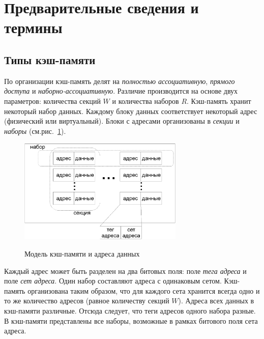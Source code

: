 

\section{Предварительные сведения и термины}


\subsection{Типы кэш-памяти}

По организации кэш-память делят на \emph{полностью ассоциативную},
\emph{прямого доступа} и \emph{наборно-ассоциативную}. Различие
производится на основе двух параметров: количества секций $W$ и
количества наборов $R$. Кэш-память хранит некоторый набор данных.
Каждому блоку данных соответствует некоторый адрес (физический или
виртуальный). Блоки с адресами организованы в \emph{секции} и
\emph{наборы} (см.рис.~\ref{cache_model}).

\begin{figure}[h] \center
  \includegraphics[width=0.7\textwidth]{1.review/cache}\\
  \caption{Модель кэш-памяти и адреса данных}\label{cache_model}
\end{figure}

Каждый адрес может быть разделен на два битовых поля: поле
\emph{тега адреса} и поле \emph{сет адреса}. Один набор составляют
адреса с одинаковым сетом. Кэш-память организована таким образом,
что для каждого сета хранится всегда одно и то же количество адресов
(равное количеству секций $W$). Адреса всех данных в кэш-памяти
различные. Отсюда следует, что теги адресов одного набора разные. В
кэш-памяти представлены все наборы, возможные в рамках битового поля
сета адреса.

